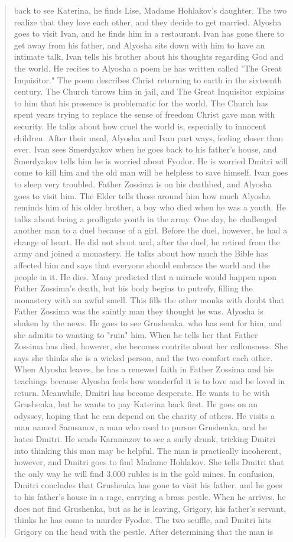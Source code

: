 \documentclass{article}
\begin{document}
\begin{quote}
back to see Katerina, he finds Lise, Madame Hohlakov's daughter. The two realize that they love each other, and they decide to get married. Alyosha goes to visit Ivan, and he finds him in a restaurant. Ivan has gone there to get away from his father, and Alyosha sits down with him to have an intimate talk. Ivan tells his brother about his thoughts regarding God and the world. He recites to Alyosha a poem he has written called "The Great Inquisitor." The poem describes Christ returning to earth in the sixteenth century. The Church throws him in jail, and The Great Inquisitor explains to him that his presence is problematic for the world. The Church has spent years trying to replace the sense of freedom Christ gave man with security. He talks about how cruel the world is, especially to innocent children. After their meal, Alyosha and Ivan part ways, feeling closer than ever. Ivan sees Smerdyakov when he goes back to his father's house, and Smerdyakov tells him he is worried about Fyodor. He is worried Dmitri will come to kill him and the old man will be helpless to save himself. Ivan goes to sleep very troubled. Father Zossima is on his deathbed, and Alyosha goes to visit him. The Elder tells those around him how much Alyosha reminds him of his older brother, a boy who died when he was a youth. He talks about being a profligate youth in the army. One day, he challenged another man to a duel because of a girl. Before the duel, however, he had a change of heart. He did not shoot and, after the duel, he retired from the army and joined a monastery. He talks about how much the Bible has affected him and says that everyone should embrace the world and the people in it. He dies. Many predicted that a miracle would happen upon Father Zossima's death, but his body begins to putrefy, filling the monastery with an awful smell. This fills the other monks with doubt that Father Zossima was the saintly man they thought he was. Alyosha is shaken by the news. He goes to see Grushenka, who has sent for him, and she admits to wanting to "ruin" him. When he tells her that Father Zossima has died, however, she becomes contrite about her callousness. She says she thinks she is a wicked person, and the two comfort each other. When Alyosha leaves, he has a renewed faith in Father Zossima and his teachings because Alyosha feels how wonderful it is to love and be loved in return. Meanwhile, Dmitri has become desperate. He wants to be with Grushenka, but he wants to pay Katerina back first. He goes on an odyssey, hoping that he can depend on the charity of others. He visits a man named Samsanov, a man who used to pursue Grushenka, and he hates Dmitri. He sends Karamazov to see a surly drunk, tricking Dmitri into thinking this man may be helpful. The man is practically incoherent, however, and Dmitri goes to find Madame Hohlakov. She tells Dmitri that the only way he will find 3,000 rubles is in the gold mines. In confusion, Dmitri concludes that Grushenka has gone to visit his father, and he goes to his father's house in a rage, carrying a brass pestle. When he arrives, he does not find Grushenka, but as he is leaving, Grigory, his father's servant, thinks he has come to murder Fyodor. The two scuffle, and Dmitri hits Grigory on the head with the pestle. After determining that the man is 
\end{quote}
\end{document}
